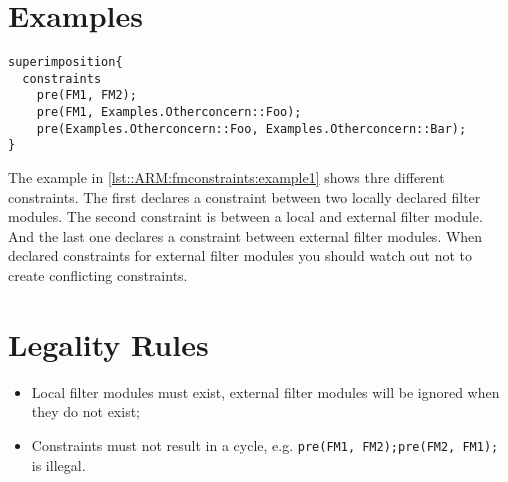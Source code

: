 \section{Examples}


\begin{lstlisting}[caption={Filter module ordering constraints}, label = lst::ARM:fmconstraints:example1, style=listing, language =ComposeStar, float = tpb]
superimposition{
  constraints
    pre(FM1, FM2);
    pre(FM1, Examples.Otherconcern::Foo);
    pre(Examples.Otherconcern::Foo, Examples.Otherconcern::Bar);
}
\end{lstlisting}

The example in \autoref{lst::ARM:fmconstraints:example1} shows thre different constraints.
The first declares a constraint between two locally declared filter modules.
The second constraint is between a local and external filter module.
And the last one declares a constraint between external filter modules.
When declared constraints for external filter modules you should watch out not to create conflicting constraints.

\section{Legality Rules}

\begin{itemize}[noitemsep]
\item Local filter modules must exist, external filter modules will be ignored when they do not exist;
\item Constraints must not result in a cycle, e.g. \lstinline|pre(FM1, FM2);pre(FM2, FM1);| is illegal.
\end{itemize}




